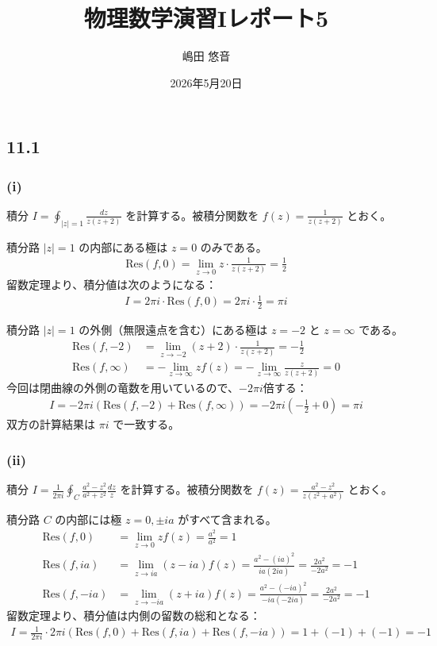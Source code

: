 \documentclass[platex,dvipdfmx,a4paper]{jsarticle}
\title{物理数学演習Iレポート5}
\author{嶋田 悠音}
\date{2026年5月20日}
\begin{document}
  \maketitle
  \subsection*{11.1}

  \subsubsection*{(i)}
  積分 $I = \oint_{|z|=1} \frac{dz}{z(z+2)}$ を計算する。被積分関数を $f(z) = \frac{1}{z(z+2)}$ とおく。

  積分路 $|z|=1$ の内部にある極は $z=0$ のみである。
  \begin{align*}
  \text{Res}(f, 0) = \lim_{z \to 0} z \cdot \frac{1}{z(z+2)} = \frac{1}{2}
  \end{align*}
  留数定理より、積分値は次のようになる：
  \begin{align*}
  I = 2\pi i \cdot \text{Res}(f, 0) = 2\pi i \cdot \frac{1}{2} = \pi i
  \end{align*}

  積分路 $|z|=1$ の外側（無限遠点を含む）にある極は $z=-2$ と $z=\infty$ である。
  \begin{align*}
  \text{Res}(f, -2) &= \lim_{z \to -2} (z+2) \cdot \frac{1}{z(z+2)} = -\frac{1}{2} \\
  \text{Res}(f, \infty) &= -\lim_{z \to \infty} z f(z) = -\lim_{z \to \infty} \frac{z}{z(z+2)} = 0
  \end{align*}
  今回は閉曲線の外側の竜数を用いているので、$-2\pi i$倍する：
  \begin{align*}
  I = -2\pi i \left( \text{Res}(f, -2) + \text{Res}(f, \infty) \right) = -2\pi i \left( -\frac{1}{2} + 0 \right) = \pi i
  \end{align*}
  双方の計算結果は $\pi i$ で一致する。

  \subsubsection*{(ii)}
  積分 $I = \frac{1}{2\pi i} \oint_{C} \frac{a^{2}-z^{2}}{a^{2}+z^{2}} \frac{dz}{z}$ を計算する。被積分関数を $f(z) = \frac{a^2-z^2}{z(z^2+a^2)}$ とおく。

  積分路 $C$ の内部には極 $z=0, \pm ia$ がすべて含まれる。
  \begin{align*}
  \text{Res}(f, 0) &= \lim_{z \to 0} z f(z) = \frac{a^2}{a^2} = 1 \\
  \text{Res}(f, ia) &= \lim_{z \to ia} (z-ia) f(z) = \frac{a^2-(ia)^2}{ia(2ia)} = \frac{2a^2}{-2a^2} = -1 \\
  \text{Res}(f, -ia) &= \lim_{z \to -ia} (z+ia) f(z) = \frac{a^2-(-ia)^2}{-ia(-2ia)} = \frac{2a^2}{-2a^2} = -1
  \end{align*}
  留数定理より、積分値は内側の留数の総和となる：
  \begin{align*}
  I = \frac{1}{2\pi i} \cdot 2\pi i \left( \text{Res}(f, 0) + \text{Res}(f, ia) + \text{Res}(f, -ia) \right) = 1 + (-1) + (-1) = -1
  \end{align*}
\end{document}
